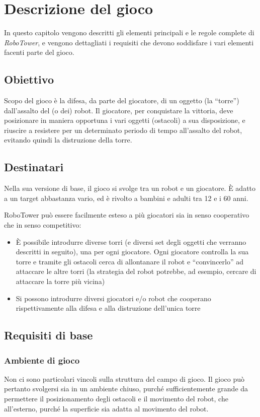 \chapter{Descrizione del gioco}
\label{cap:descrizione}

In questo capitolo vengono descritti gli elementi principali e le regole complete di \emph{RoboTower}, e vengono dettagliati i requisiti che devono soddisfare i vari elementi facenti parte del gioco.

\section{Obiettivo}
Scopo del gioco è la difesa, da parte del giocatore, di un oggetto (la ``torre'') dall'assalto del (o dei) robot. 
Il giocatore, per conquistare la vittoria, deve posizionare in maniera opportuna i vari oggetti (ostacoli) a sua disposizione, e riuscire a resistere per un determinato periodo di tempo all'assalto del robot, evitando quindi la distruzione della torre.

\section{Destinatari}
Nella sua versione di base, il gioco si svolge tra un robot e un giocatore. È adatto a un target abbastanza vario, ed è rivolto a bambini e adulti tra 12 e i 60 anni.

RoboTower può essere facilmente esteso a più giocatori sia in senso cooperativo che in senso competitivo:
	\begin{itemize}
		\item È possibile introdurre diverse torri (e diversi set degli oggetti che verranno descritti in seguito), una per ogni giocatore. Ogni giocatore controlla la sua torre e tramite gli ostacoli cerca di allontanare il robot e ``convincerlo'' ad attaccare le altre torri (la strategia del robot potrebbe, ad esempio, cercare di attaccare la torre più vicina)
		\item Si possono introdurre diversi giocatori e/o robot che cooperano rispettivamente alla difesa e alla distruzione dell'unica torre
	\end{itemize}

\section{Requisiti di base}

\subsection*{Ambiente di gioco}
Non ci sono particolari vincoli sulla struttura del campo di gioco. Il gioco può pertanto svolgersi sia in un ambiente chiuso, purché sufficientemente grande da permettere il posizionamento degli ostacoli e il movimento del robot, che all'esterno, purché la superficie sia adatta al movimento del robot.

